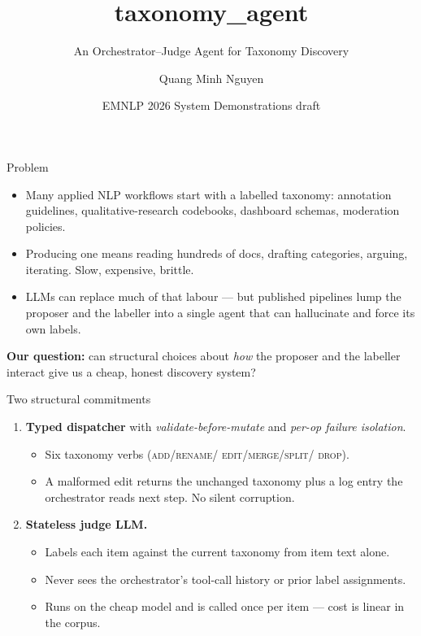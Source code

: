 \documentclass[10pt,aspectratio=169]{beamer}
\title{taxonomy\_agent}
\subtitle{An Orchestrator--Judge Agent for Taxonomy Discovery}
\author{Quang Minh Nguyen}
\institute{KAIST}
\date{EMNLP 2026 System Demonstrations draft}
\begin{document}
\maketitle

\begin{frame}{Problem}
  \begin{itemize}
    \item Many applied NLP workflows start with a labelled taxonomy:
          annotation guidelines, qualitative-research codebooks,
          dashboard schemas, moderation policies.
    \item Producing one means reading hundreds of docs, drafting
          categories, arguing, iterating. Slow, expensive, brittle.
    \item LLMs can replace much of that labour — but published
          pipelines lump the proposer and the labeller into a single
          agent that can hallucinate and force its own labels.
  \end{itemize}
  \vspace{1em}
  \textbf{Our question:} can structural choices about \emph{how} the
  proposer and the labeller interact give us a cheap, honest discovery
  system?
\end{frame}

\begin{frame}{Two structural commitments}
  \begin{enumerate}
    \item \textbf{Typed dispatcher} with \emph{validate-before-mutate}
          and \emph{per-op failure isolation}.
          \begin{itemize}
            \item Six taxonomy verbs (\textsc{add}/\textsc{rename}/
                  \textsc{edit}/\textsc{merge}/\textsc{split}/
                  \textsc{drop}).
            \item A malformed edit returns the unchanged taxonomy
                  plus a log entry the orchestrator reads next step.
                  No silent corruption.
          \end{itemize}
    \item \textbf{Stateless judge LLM.}
          \begin{itemize}
            \item Labels each item against the current taxonomy from
                  item text alone.
            \item Never sees the orchestrator's tool-call history or
                  prior label assignments.
            \item Runs on the cheap model and is called once per
                  item — cost is linear in the corpus.
          \end{itemize}
  \end{enumerate}
\end{frame}
\end{document}
